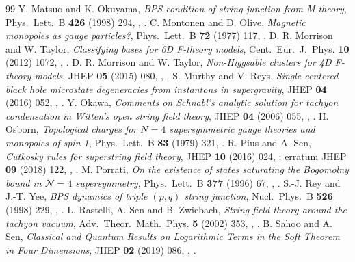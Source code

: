 \begin{thebibliography}{99}
 Y. Matsuo and K. Okuyama, \emph{BPS condition of string junction from M theory}, Phys.\ Lett.\ B \textbf{426} (1998) 294, , .
 C. Montonen and D. Olive, \emph{Magnetic monopoles as gauge particles?}, Phys.\ Lett.\ B \textbf{72} (1977) 117, .
 D. R. Morrison and W. Taylor, \emph{Classifying bases for 6D F-theory models}, Cent.\ Eur.\ J.\ Phys. \textbf{10} (2012) 1072, , .
 D. R. Morrison and W. Taylor, \emph{Non-Higgsable clusters for 4D F-theory models}, JHEP \textbf{05} (2015) 080, , .
 S. Murthy and V. Reys, \emph{Single-centered black hole microstate degeneracies from instantons in supergravity}, JHEP \textbf{04} (2016) 052, , .
 Y. Okawa, \emph{Comments on Schnabl's analytic solution for ta\-chy\-on con\-den\-sa\-tion in Witten's open string field theory}, JHEP \textbf{04} (2006) 055, , .
 H. Osborn, \emph{Topological charges for $N=4$ supersymmetric gauge theories and monopoles of spin 1}, Phys.\ Lett.\ B \textbf{83} (1979) 321, .
 R. Pius and A. Sen, \emph{Cutkosky rules for superstring field theory}, JHEP \textbf{10} (2016) 024, ; erratum JHEP \textbf{09} (2018) 122, , .
 M. Porrati, \emph{On the existence of states saturating the Bogomolny bound in $\mathcal N=4$ supersymmetry}, Phys.\ Lett.\ B \textbf{377} (1996) 67, , .
 S.-J. Rey and J.-T. Yee, \emph{BPS dynamics of triple $(p,q)$ string junction}, Nucl.\ Phys.\ B \textbf{526} (1998) 229, , .
 L. Rastelli, A. Sen and B. Zwiebach, \emph{String field theory around the tachyon vacuum}, Adv.\ Theor.\ Math.\ Phys. \textbf{5} (2002) 353, , .
 B. Sahoo and A. Sen, \emph{Classical and Quantum Results on Logarithmic Terms in the Soft Theorem in Four Dimensions}, JHEP \textbf{02} (2019) 086, , .

\end{thebibliography}
